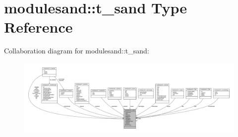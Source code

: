 \hypertarget{structmodulesand_1_1t__sand}{}\section{modulesand\+:\+:t\+\_\+sand Type Reference}
\label{structmodulesand_1_1t__sand}


Collaboration diagram for modulesand\+:\+:t\+\_\+sand\+:\nopagebreak
\begin{figure}[H]
\begin{center}
\leavevmode
\includegraphics[width=350pt]{structmodulesand_1_1t__sand__coll__graph}
\end{center}
\end{figure}
